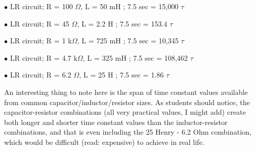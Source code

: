 \item{$\bullet$} LR circuit; R = 100 $\Omega$, L = 50 mH ; 7.5 sec = 15,000 $\tau$
\item{$\bullet$} LR circuit; R = 45 $\Omega$, L = 2.2 H ; 7.5 sec = 153.4 $\tau$
\item{$\bullet$} LR circuit; R = 1 k$\Omega$, L = 725 mH ; 7.5 sec = 10,345 $\tau$
\item{$\bullet$} LR circuit; R = 4.7 k$\Omega$, L = 325 mH ; 7.5 sec = 108,462 $\tau$
\item{$\bullet$} LR circuit; R = 6.2 $\Omega$, L = 25 H ; 7.5 sec = 1.86 $\tau$







An interesting thing to note here is the span of time constant values available from common capacitor/inductor/resistor sizes.  As students should notice, the capacitor-resistor combinations (all very practical values, I might add) create both longer and shorter time constant values than the inductor-resistor combinations, and that is even including the 25 Henry - 6.2 Ohm combination, which would be difficult (read: expensive) to achieve in real life.




